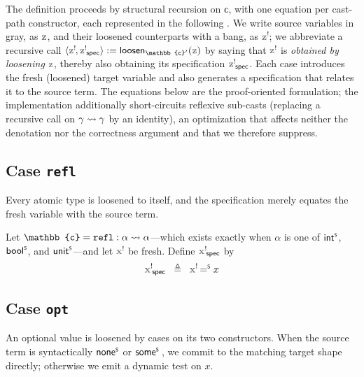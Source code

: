 The definition proceeds by structural recursion on $\mathbb{c}$, with one equation per cast-path constructor, each represented in the following .
We write source variables in gray, as $\var{z}$, and their loosened counterparts with a bang, as $\lvar{z}$; we abbreviate a recursive call $\langle \lvar{z}, \spec{\lvar{z}} \rangle := \mathsf{loosen}_{\mathbb{c}'}(\var{z})$ by saying that $\lvar{z}$ is \emph{obtained by loosening} $\var{z}$, thereby also obtaining its specification $\spec{\lvar{z}}$.
Each case introduces the fresh (loosened) target variable and also generates a specification that relates it to the source term.
The equations below are the proof-oriented formulation; the implementation additionally short-circuits reflexive sub-casts (replacing a recursive call on $\gamma \rightsquigarrow \gamma$ by an identity), an optimization that affects neither the denotation nor the correctness argument and that we therefore suppress.

\subsection{Case \texttt{refl}}\label{case:refl}
Every atomic type is loosened to itself, and the specification merely equates the fresh variable with the source term.
\begin{definition}
Let $\mathbb{c} = \mathtt{refl} : \castpath{\alpha}{\alpha}$---which exists exactly when $\alpha$ is one of $\mathsf{int}^{\scriptscriptstyle{\mathsf{S}}}$, $\mathsf{bool}^{\scriptscriptstyle{\mathsf{S}}}$, and $\mathsf{unit}^{\scriptscriptstyle{\mathsf{S}}}$---and let $\lvar{x}$ be fresh. Define $\spec{\lvar{x}}$ by
\[
  \spec{\lvar{x}} \;\;\triangleq\;\; \lvar{x} \eqS x
\]
\end{definition}

\subsection{Case \texttt{opt}}\label{case:opt}
An optional value is loosened by cases on its two constructors. When the source term is syntactically $\mathord{\mathsf{none}^{\scriptscriptstyle{\mathsf{S}}}}$ or $\mathord{\mathsf{some}^{\scriptscriptstyle{\mathsf{S}}}}\,$, we commit to the matching target shape directly; otherwise we emit a dynamic test on $x$.

